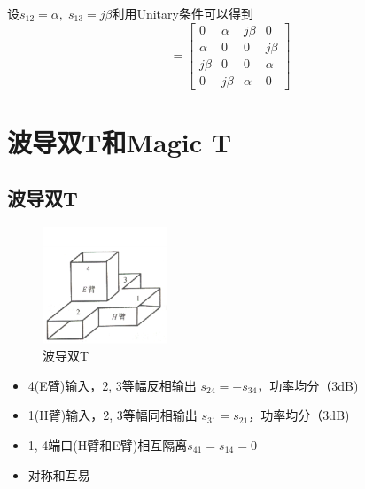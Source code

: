\documentclass[a4paper]{report}
\begin{document}
设$s_{12}=\alpha,\; s_{13}=j\beta$利用Unitary条件可以得到
\begin{equation}
  [s]=\begin{bmatrix}
    0&\alpha&j\beta&0
    \\ \alpha &0&0&j\beta
    \\ j\beta &0&0&\alpha
    \\ 0 &j\beta &\alpha &0
  \end{bmatrix}
\end{equation}


\section{波导双T和Magic T}
\subsection{波导双T}
\begin{figure}[H]
\centering
\includegraphics[width=0.33\textwidth]{double_t.png}
\caption{波导双T}
\end{figure}
\begin{itemize}
  \item 4(E臂)输入，2, 3等幅反相输出 $s_{24}= -s_{34} $，功率均分（3dB)
  \item 1(H臂)输入，2, 3等幅同相输出 $s_{31}= s_{21} $，功率均分（3dB)
  \item 1, 4端口(H臂和E臂)相互隔离$s_{41}=s_{14}=0$
  \item 对称和互易
\end{itemize}
\end{document}

